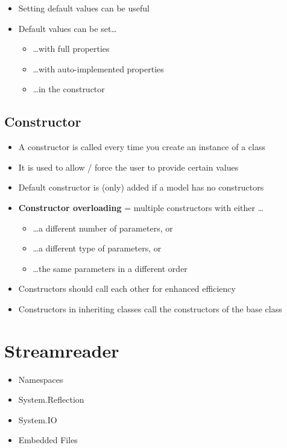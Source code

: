 \documentclass{article}
\newcommand{\bold}[1]{\textbf{#1}}
\begin{document}
\begin{itemize}
    \item Setting default values can be useful
    \item Default values can be set\dots
    \begin{itemize}
        \item \dots with full properties
        \item \dots with auto-implemented properties
        \item \dots in the constructor
    \end{itemize}
\end{itemize}

\subsection{Constructor}

\begin{itemize}
    \item A constructor is called every time you create an instance of a class
    \item It is used to allow / force the user to provide certain values
    \item Default constructor is (only) added if a model has no constructors
    \item \bold{Constructor overloading} = multiple constructors with either \dots
    \begin{itemize}
        \item \dots a different number of parameters, or
        \item \dots a different type of parameters, or
        \item \dots the same parameters in a different order
    \end{itemize}
    \item Constructors should call each other for enhanced efficiency
    \item Constructors in inheriting classes call the constructors of the base class
\end{itemize}


\section{Streamreader}

\begin{itemize}
    \item Namespaces
    \item System.Reflection
    \item System.IO
    \item Embedded Files
\end{itemize}
\end{document}
